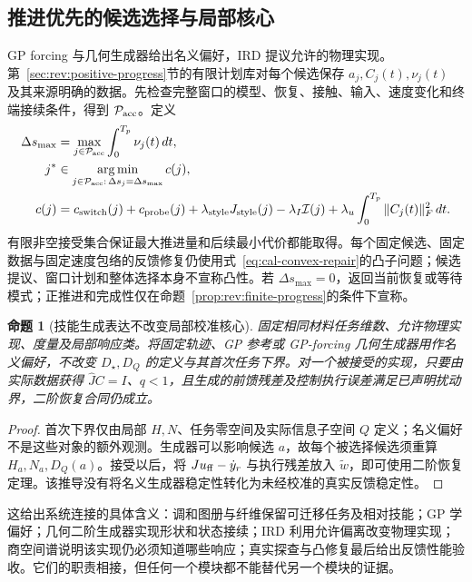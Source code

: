 \documentclass[11pt,a4paper]{article}
\numberwithin{equation}{section}
\newtheorem{proposition}[theorem]{命题}
\theoremstyle{definition}
\begin{document}
\subsection{推进优先的候选选择与局部核心}
GP forcing 与几何生成器给出名义偏好，IRD 提议允许的物理实现。第~\ref{sec:rev:positive-progress}节的有限计划库对每个候选保存 $a_j,C_j(t),\nu_j(t)$ 及其来源明确的数据。先检查完整窗口的模型、恢复、接触、输入、速度变化和终端接续条件，得到 $\mathcal P_{\rm acc}$。定义
\begin{align}
 \Delta s_{\max}&=\max_{j\in\mathcal P_{\rm acc}}\int_0^{T_p}\nu_j(t)\,dt,\\
 j^*&\in\operatorname*{arg\,min}_{j\in\mathcal P_{\rm acc}:
            \,\Delta s_j=\Delta s_{\max}} c(j),\\
 c(j)&=c_{\rm switch}(j)+c_{\rm probe}(j)
       +\lambda_{\rm style}J_{\rm style}(j)
       -\lambda_I\mathcal I(j)
       +\lambda_u\int_0^{T_p}\|C_j(t)\|_F^2\,dt.
 \label{eq:v43:joint-choice}
\end{align}
有限非空接受集合保证最大推进量和后续最小代价都能取得。每个固定候选、固定数据与固定速度包络的反馈修复仍使用式~\eqref{eq:cal-convex-repair}的凸子问题；候选提议、窗口计划和整体选择本身不宣称凸性。若 $\Delta s_{\max}=0$，返回当前恢复或等待模式；正推进和完成性仅在命题~\ref{prop:rev:finite-progress}的条件下宣称。

\begin{proposition}[技能生成表达不改变局部校准核心]
\label{prop:v43:core-unchanged}
固定相同材料任务维数、允许物理实现、度量及局部响应类。将固定轨迹、GP 参考或 GP-forcing 几何生成器用作名义偏好，不改变 $D_\star,D_Q$ 的定义与其首次任务下界。对一个被接受的实现，只要由实际数据获得 $\widehat JC=I$、$q<1$，且生成的前馈残差及控制执行误差满足已声明扰动界，二阶恢复合同仍成立。
\end{proposition}
\begin{proof}
首次下界仅由局部 $H,N$、任务零空间及实际信息子空间 $Q$ 定义；名义偏好不是这些对象的额外观测。生成器可以影响候选 $a$，故每个被选择候选须重算 $H_a,N_a,D_Q(a)$。接受以后，将 $Ju_{\rm ff}-\dot y_r$ 与执行残差放入 $\widetilde w$，即可使用二阶恢复定理。该推导没有将名义生成器稳定性转化为未经校准的真实反馈稳定性。
\end{proof}

这给出系统连接的具体含义：调和图册与纤维保留可迁移任务及相对技能；GP 学偏好；几何二阶生成器实现形状和状态接续；IRD 利用允许偏离改变物理实现；商空间谱说明该实现仍必须知道哪些响应；真实探查与凸修复最后给出反馈性能验收。它们的职责相接，但任何一个模块都不能替代另一个模块的证据。
\end{document}
